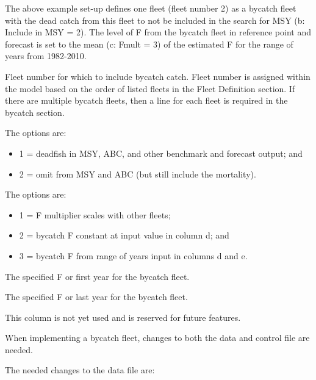 The above example set-up defines one fleet (fleet number 2) as a bycatch fleet with the dead catch from this fleet to not be included in the search for MSY (b: Include in MSY = 2). The level of F from the bycatch fleet in reference point and forecast is set to the mean (c: Fmult = 3) of the estimated F for the range of years from 1982-2010.  


Fleet number for which to include bycatch catch. Fleet number is assigned within the model based on the order of listed fleets in the Fleet Definition section. If there are multiple bycatch fleets, then a line for each fleet is required in the bycatch section.


The options are:	  
  \begin{itemize}
  	\item 1 = deadfish in MSY, ABC, and other benchmark and forecast output; and
  	\item 2 = omit from MSY and ABC (but still include the mortality).
  \end{itemize}

The options are:  
  \begin{itemize}
  	\item 1 = F multiplier scales with other fleets;
  	\item 2 = bycatch F constant at input value in column d; and
  	\item 3 = bycatch F from range of years input in columns d and e.
  \end{itemize}

The specified F or first year for the bycatch fleet.

The specified F or last year for the bycatch fleet.

This column is not yet used and is reserved for future features.

When implementing a bycatch fleet, changes to both the data and control file are needed.  

The needed changes to the data file are:

